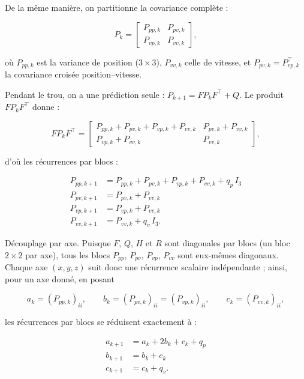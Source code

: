 \documentclass[11pt]{article}
\theoremstyle{remark}
\theoremstyle{definition}
\begin{document}
De la même manière, on partitionne la covariance complète :

\begin{equation}
P_k =
\begin{bmatrix}
P_{pp,k} & P_{pv,k} \\[2pt]
P_{vp,k} & P_{vv,k}
\end{bmatrix},
\end{equation}

où $P_{pp,k}$ est la variance de position ($3\times 3$), $P_{vv,k}$ celle de vitesse, et
$P_{pv,k} = P_{vp,k}^\top$ la covariance croisée position--vitesse.

Pendant le trou, on a une prédiction seule : $P_{k+1} = F P_k F^\top + Q$. Le produit
$F P_k F^\top$ donne :

\begin{equation}
F P_k F^\top =
\begin{bmatrix}
P_{pp,k} + P_{pv,k} + P_{vp,k} + P_{vv,k} & P_{pv,k} + P_{vv,k} \\[2pt]
P_{vp,k} + P_{vv,k} & P_{vv,k}
\end{bmatrix},
\end{equation}

d'où les récurrences par blocs :

\begin{equation}
\boxed{\begin{aligned}
P_{pp,k+1} &= P_{pp,k} + P_{pv,k} + P_{vp,k} + P_{vv,k} + q_p\,I_3 \\[2pt]
P_{pv,k+1} &= P_{pv,k} + P_{vv,k} \\[2pt]
P_{vp,k+1} &= P_{vp,k} + P_{vv,k} \\[2pt]
P_{vv,k+1} &= P_{vv,k} + q_v\,I_3 .
\end{aligned}}
\end{equation}

Découplage par axe. Puisque $F$, $Q$, $H$ et $R$ sont diagonales par blocs (un bloc
$2\times 2$ par axe), tous les blocs $P_{pp}$, $P_{pv}$, $P_{vp}$, $P_{vv}$ sont eux-mêmes
diagonaux. Chaque axe $(x,y,z)$ suit donc une récurrence scalaire indépendante ;
ainsi, pour un axe donné, en posant

\begin{equation}
a_k = (P_{pp,k})_{ii},\qquad b_k = (P_{pv,k})_{ii} = (P_{vp,k})_{ii},\qquad c_k = (P_{vv,k})_{ii},
\end{equation}

les récurrences par blocs se réduisent exactement à :

\begin{equation}
\boxed{\begin{aligned}
a_{k+1} &= a_k + 2b_k + c_k + q_p \\[2pt]
b_{k+1} &= b_k + c_k \\[2pt]
c_{k+1} &= c_k + q_v .
\end{aligned}}
\end{equation}
\end{document}
